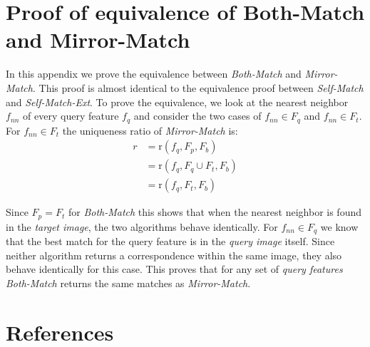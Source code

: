 \documentclass[review]{elsarticle}
\begin{document}
\section{Proof of equivalence of Both-Match and Mirror-Match}
\label{A:mirror}

In this appendix we prove the equivalence between \emph{Both-Match} and \emph{Mirror-Match}. This proof is almost identical to the equivalence proof between \emph{Self-Match} and \emph{Self-Match-Ext}. To prove the equivalence, we look at the nearest neighbor $f_{nn}$ of every query feature $f_{q}$ and consider the two cases of $f_{nn} \in F_{q}$ and $f_{nn} \in F_{t}$. For $f_{nn} \in F_{t}$ the uniqueness ratio of \emph{Mirror-Match} is:
\begin{align*}
    r &= \text{r}(f_{q}, F_{p}, F_{b}) \\
        &= \text{r}(f_{q}, F_{q} \cup F_{t}, F_{b})\\
        &= \text{r}(f_{q}, F_{t}, F_{b})
\end{align*}

Since $F_{p} = F_{t}$ for \emph{Both-Match} this shows that when the nearest neighbor is found in the \emph{target image}, the two algorithms behave identically. For $f_{nn} \in F_{q}$ we know that the best match for the query feature is in the \emph{query image} itself. Since neither algorithm returns a correspondence within the same image, they also behave identically for this case. This proves that for any set of \emph{query features} \emph{Both-Match} returns the same matches as \emph{Mirror-Match}.

\balance

\section*{References}


\end{document}
